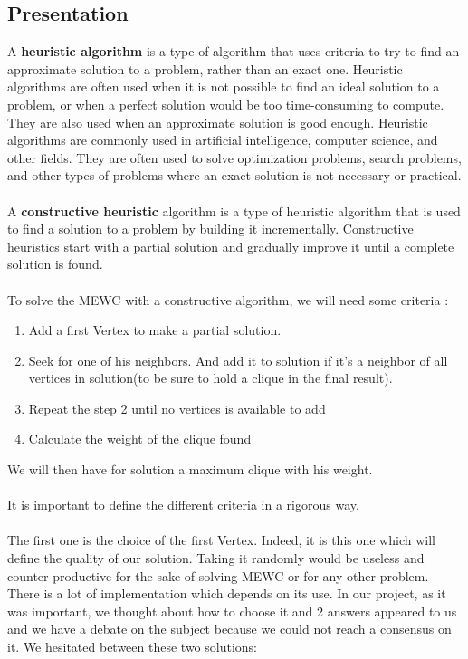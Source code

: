 
\subsection{Presentation}

    A \textbf{heuristic algorithm} is a type of algorithm that uses criteria to try to find an approximate solution to a problem, rather than an exact one. Heuristic algorithms are often used when it is not possible to find an ideal solution to a problem, or when a perfect solution would be too time-consuming to compute. They are also used when an approximate solution is good enough. Heuristic algorithms are commonly used in artificial intelligence, computer science, and other fields. They are often used to solve optimization problems, search problems, and other types of problems where an exact solution is not necessary or practical.
    \\ \\
    A \textbf{constructive heuristic} algorithm is a type of heuristic algorithm that is used to find a solution to a problem by building it incrementally. Constructive heuristics start with a partial solution and gradually improve it until a complete solution is found.
    \\ \\
    To solve the MEWC with a constructive algorithm, we will need some criteria : 

    \begin{enumerate}
        \item Add a first Vertex to make a partial solution.
        \item Seek for one of his neighbors. And add it to solution if it's a neighbor of all vertices in solution(to be sure to hold a clique in the final result).
        \item Repeat the step 2 until no vertices is available to add
        \item Calculate the weight of the clique found
    \end{enumerate}

    We will then have for solution a maximum clique with his weight. 
    \\ \\
    It is important to define the different criteria in a rigorous way. 
    \\ \\
    The first one is the choice of the first Vertex. Indeed, it is this one which will define the quality of our solution. Taking it randomly would be useless and counter productive for the sake of solving MEWC or for any other problem. There is a lot of implementation which depends on its use. In our project, as it was important, we thought about how to choose it and 2 answers appeared to us and we have a debate on the subject because we could not reach a consensus on it. We hesitated between these two solutions:

